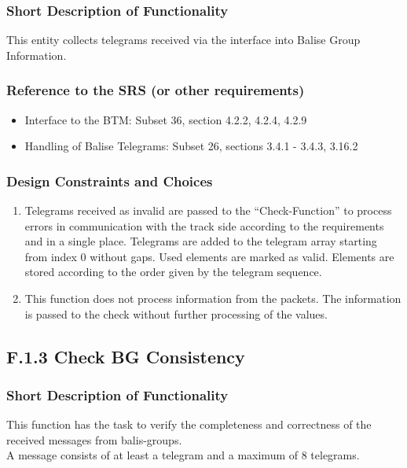 \documentclass{template/openetcs_report}
\begin{document}
\subsubsection{Short Description of Functionality}
This entity collects telegrams received via the interface into Balise Group Information.
	
\subsubsection{Reference to the SRS (or other requirements)}
\begin{itemize}
\item Interface to the BTM: Subset 36, section  4.2.2, 4.2.4, 4.2.9\\
\item Handling of Balise Telegrams: Subset 26, sections 3.4.1 - 3.4.3, 3.16.2 \\
\end{itemize}

\subsubsection{Design Constraints and Choices}
\begin{enumerate}
\item Telegrams received as invalid are passed to the ``Check-Function'' to process errors in communication with the track side according to the requirements and in a single place.
Telegrams are added to the telegram array starting from index 0 without gaps. Used elements are marked as valid. Elements are stored according to the order given by the telegram sequence.
\item This function does not process information from the packets. The information is passed to the check without further processing of the values. 
\end{enumerate}



\subsection{F.1.3 Check BG Consistency}

\subsubsection{Short Description of Functionality}
This function has the task  to verify the completeness and correctness of the received messages from balis-groups.\\
A message consists of at least a telegram and a maximum of 8 telegrams.\\
\end{document}
